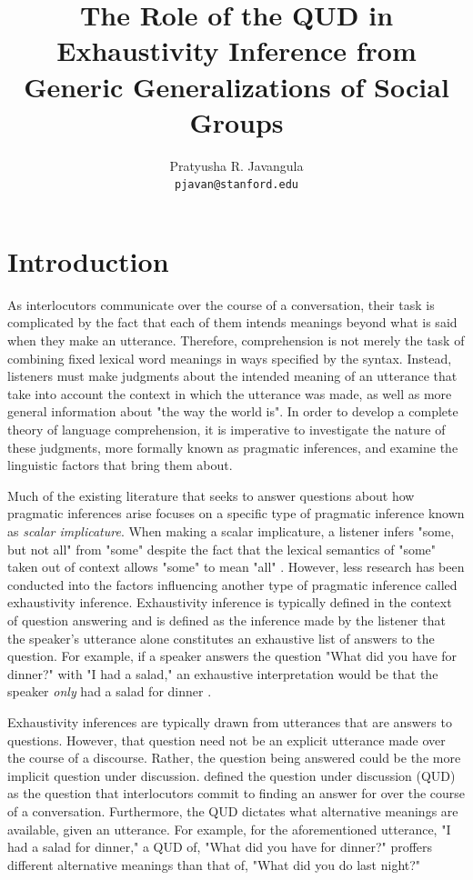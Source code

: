 \documentclass[11pt,a4paper]{article}
\title{The Role of the QUD in Exhaustivity Inference from Generic Generalizations of Social Groups}
\author{Pratyusha R. Javangula \\
  {\tt pjavan@stanford.edu} \\}
\date{}
\begin{document}
\maketitle

\section{Introduction}

As interlocutors communicate over the course of a conversation, their task is complicated by the fact that each of them intends meanings beyond what is said when they make an utterance. Therefore, comprehension is not merely the task of combining fixed lexical word meanings in ways specified by the syntax. Instead, listeners must make judgments about the intended meaning of an utterance that take into account the context in which the utterance was made, as well as more general information about "the way the world is". In order to develop a complete theory of language comprehension, it is imperative to investigate the nature of these judgments, more formally known as pragmatic inferences, and examine the linguistic factors that bring them about. 

Much of the existing literature that seeks to answer questions about how pragmatic inferences arise focuses on a specific type of pragmatic inference known as \textit{scalar implicature}. When making a scalar implicature, a listener infers "some, but not all" from "some" despite the fact that the lexical semantics of "some" taken out of context allows "some" to mean "all" \cite{carston-1998}. However, less research has been conducted into the factors influencing another type of pragmatic inference called exhaustivity inference. Exhaustivity inference is typically defined in the context of question answering and is defined as the inference made by the listener that the speaker's utterance alone constitutes an exhaustive list of answers to the question. For example, if a speaker answers the question "What did you have for dinner?" with "I had a salad," an exhaustive interpretation would be that the speaker \textit{only} had a salad for dinner \cite{vanRooij2004}. 

Exhaustivity inferences are typically drawn from utterances that are answers to questions. However, that question need not be an explicit utterance made over the course of a discourse. Rather, the question being answered could be the more implicit question under discussion. \citet{roberts-1996} defined the question under discussion (QUD) as the question that interlocutors commit to finding an answer for over the course of a conversation. Furthermore, the QUD dictates what alternative meanings are available, given an utterance. For example, for the aforementioned utterance, "I had a salad for dinner," a QUD of, "What did you have for dinner?" proffers different alternative meanings than that of, "What did you do last night?" 
\end{document}

